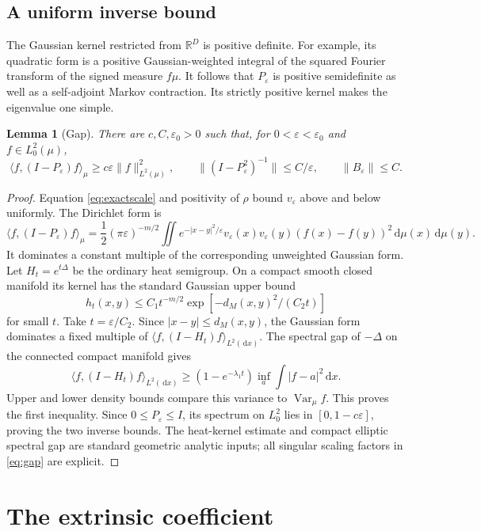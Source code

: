 \documentclass[11pt,a4paper]{article}
\newtheorem{lemma}[theorem]{Lemma}
\theoremstyle{definition}\newtheorem{definition}[theorem]{Definition}
\theoremstyle{remark}\newtheorem{remark}[theorem]{Remark}
\newcommand{\eps}{\varepsilon}
\newcommand{\dd}{\,\mathrm d}
\newcommand{\R}{\mathbb R}
\newcommand{\ip}[2]{\langle #1,#2\rangle_\mu}
\newcommand{\norm}[1]{\lVert #1\rVert}
\begin{document}
\subsection{A uniform inverse bound}
The Gaussian kernel restricted from $\R^D$ is positive definite. For example, its quadratic form is a positive Gaussian-weighted integral of the squared Fourier transform of the signed measure $f\mu$. It follows that $P_\eps$ is positive semidefinite as well as a self-adjoint Markov contraction. Its strictly positive kernel makes the eigenvalue one simple.

\begin{lemma}[Gap]\label{lem:gap}
There are $c,C,\eps_0>0$ such that, for $0<\eps<\eps_0$ and $f\in L^2_0(\mu)$,
\begin{equation}\label{eq:gap}
\ip{f}{(I-P_\eps)f}\geq c\eps\norm{f}_{L^2(\mu)}^2,
\qquad \norm{(I-P_\eps^2)^{-1}}\leq C/\eps,
\qquad \norm{B_\eps}\leq C.
\end{equation}
\end{lemma}
\begin{proof}
Equation \eqref{eq:exactscale} and positivity of $\rho$ bound $v_\eps$ above and below uniformly. The Dirichlet form is
\[
\ip{f}{(I-P_\eps)f}
=\frac12(\pi\eps)^{-m/2}\iint e^{-|x-y|^2/\eps}
v_\eps(x)v_\eps(y)(f(x)-f(y))^2\dd\mu(x)\dd\mu(y).
\]
It dominates a constant multiple of the corresponding unweighted Gaussian form. Let $H_t=e^{t\Delta}$ be the ordinary heat semigroup. On a compact smooth closed manifold its kernel has the standard Gaussian upper bound \cite[Corollary 3.1]{LiYau}
\[
h_t(x,y)\leq C_1t^{-m/2}\exp\left[-d_M(x,y)^2/(C_2t)\right]
\]
for small $t$. Take $t=\eps/C_2$. Since $|x-y|\leq d_M(x,y)$, the Gaussian form dominates a fixed multiple of $\langle f,(I-H_t)f\rangle_{L^2(\dd x)}$. The spectral gap of $-\Delta$ on the connected compact manifold gives
\[
\langle f,(I-H_t)f\rangle_{L^2(\dd x)}
\geq (1-e^{-\lambda_1t})\inf_a\int|f-a|^2\dd x.
\]
Upper and lower density bounds compare this variance to $\operatorname{Var}_\mu f$. This proves the first inequality. Since $0\leq P_\eps\leq I$, its spectrum on $L^2_0$ lies in $[0,1-c\eps]$, proving the two inverse bounds. The heat-kernel estimate and compact elliptic spectral gap are standard geometric analytic inputs; all singular scaling factors in \eqref{eq:gap} are explicit.
\end{proof}

\section{The extrinsic coefficient}\label{sec:curvature}
\end{document}
